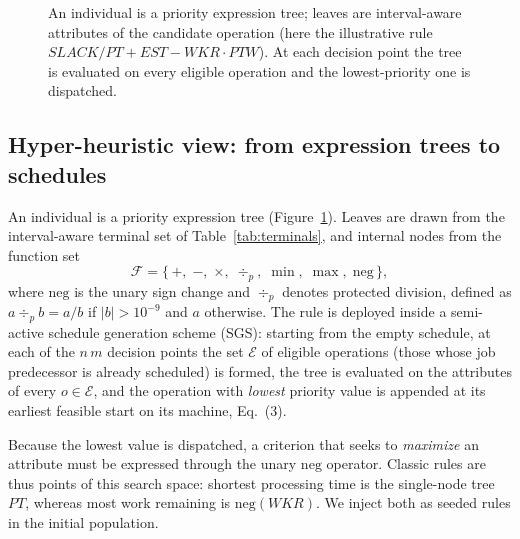\documentclass[review,authoryear,11pt]{elsarticle}
\begin{document}
\begin{figure}[!t]
\centering
{}
\caption{An individual is a priority expression tree; leaves are
interval-aware attributes of the candidate operation (here the
illustrative rule $\mathit{SLACK}/\mathit{PT} + \mathit{EST} -
\mathit{WKR}\cdot\mathit{PTW}$). At each decision point the tree is
evaluated on every eligible operation and the lowest-priority one is
dispatched.}
\label{fig:tree}
\end{figure}

\subsection{Hyper-heuristic view: from expression trees to schedules}
\label{sec:hhview}
An individual is a priority expression tree (Figure~\ref{fig:tree}).
Leaves are drawn from the interval-aware terminal set of
Table~\ref{tab:terminals}, and internal nodes from the function set
\begin{equation}
\mathcal{F} = \{\, +,\; -,\; \times,\; \div_p,\; \min,\; \max,\;
\mathrm{neg} \,\},
\end{equation}
where $\mathrm{neg}$ is the unary sign change and $\div_p$ denotes
protected division, defined as $a \div_p b = a/b$ if $|b| > 10^{-9}$ and
$a$ otherwise. The rule is deployed inside a semi-active schedule generation
scheme (SGS): starting from the empty schedule, at each of the $n\,m$
decision points the set $\mathcal{E}$ of eligible operations (those
whose job predecessor is already scheduled) is formed, the tree is
evaluated on the attributes of every $o \in \mathcal{E}$, and the
operation with \emph{lowest} priority value is appended at its earliest
feasible start on its machine, Eq.~(3).

Because the lowest value is dispatched, a criterion that seeks to \emph{maximize}
an attribute must be expressed through the unary $\mathrm{neg}$
operator. Classic rules are thus points of this search space: shortest
processing time is the single-node tree $\mathit{PT}$, whereas most work
remaining is $\mathrm{neg}(\mathit{WKR})$. We inject both as seeded rules in the initial population.
\end{document}
